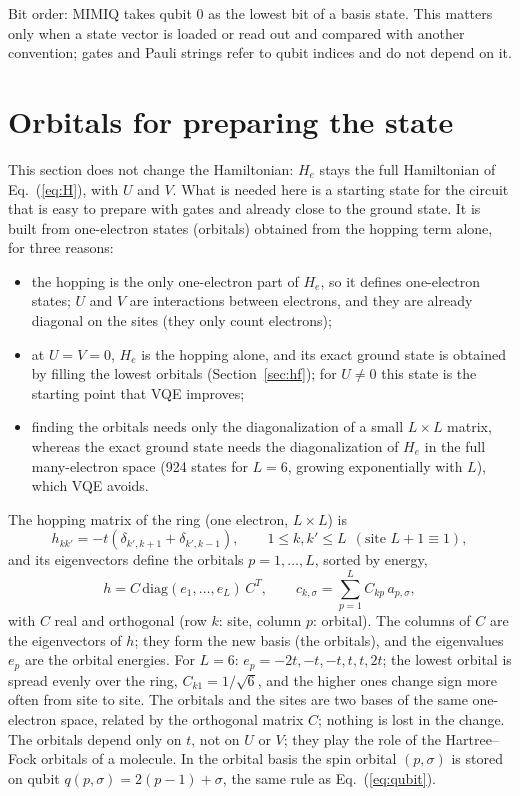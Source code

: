 \documentclass[11pt,a4paper]{article}
\begin{document}
Bit order: MIMIQ takes qubit 0 as the lowest bit of a basis state. This
matters only when a state vector is loaded or read out and compared with
another convention; gates and Pauli strings refer to qubit indices and do not
depend on it.

\section{Orbitals for preparing the state}\label{sec:orbitals}

This section does not change the Hamiltonian: $H_e$ stays the full
Hamiltonian of Eq.~(\ref{eq:H}), with $U$ and $V$. What is needed here is a
starting state for the circuit that is easy to prepare with gates and already
close to the ground state. It is built from one-electron states (orbitals)
obtained from the hopping term alone, for three reasons:
\begin{itemize}
  \item the hopping is the only one-electron part of $H_e$, so it defines
    one-electron states; $U$ and $V$ are interactions between electrons, and
    they are already diagonal on the sites (they only count electrons);
  \item at $U = V = 0$, $H_e$ is the hopping alone, and its exact ground state
    is obtained by filling the lowest orbitals (Section~\ref{sec:hf}); for
    $U \ne 0$ this state is the starting point that VQE improves;
  \item finding the orbitals needs only the diagonalization of a small
    $L \times L$ matrix, whereas the exact ground state needs the
    diagonalization of $H_e$ in the full many-electron space (924 states for
    $L = 6$, growing exponentially with $L$), which VQE avoids.
\end{itemize}
The hopping matrix of the ring (one electron, $L \times L$) is
\begin{equation}
  h_{kk'} = -t \left( \delta_{k',k+1} + \delta_{k',k-1} \right) , \qquad
  1 \le k, k' \le L \ \ (\text{site } L+1 \equiv 1),
\end{equation}
and its eigenvectors define the orbitals $p = 1, \dots, L$, sorted by energy,
\begin{equation}\label{eq:orbitals}
  h = C \, \mathrm{diag}(e_1, \dots, e_L) \, C^{T} , \qquad
  c_{k,\sigma} = \sum_{p=1}^{L} C_{kp}\, a_{p,\sigma} ,
\end{equation}
with $C$ real and orthogonal (row $k$: site, column $p$: orbital). The
columns of $C$ are the eigenvectors of $h$; they form the new basis (the
orbitals), and the eigenvalues $e_p$ are the orbital energies. For $L = 6$:
$e_p = -2t, -t, -t, t, t, 2t$; the lowest orbital is spread evenly over the
ring, $C_{k1} = 1/\sqrt{6}$, and the higher ones change sign more often from
site to site. The orbitals and the sites are two bases of the same
one-electron space, related by the orthogonal matrix $C$; nothing is lost in
the change. The orbitals depend only on $t$, not on $U$ or $V$; they play the
role of the Hartree--Fock orbitals of a molecule. In the
orbital basis the spin orbital $(p,\sigma)$ is stored on qubit
$q(p,\sigma) = 2(p-1) + \sigma$, the same rule as Eq.~(\ref{eq:qubit}).
\end{document}
